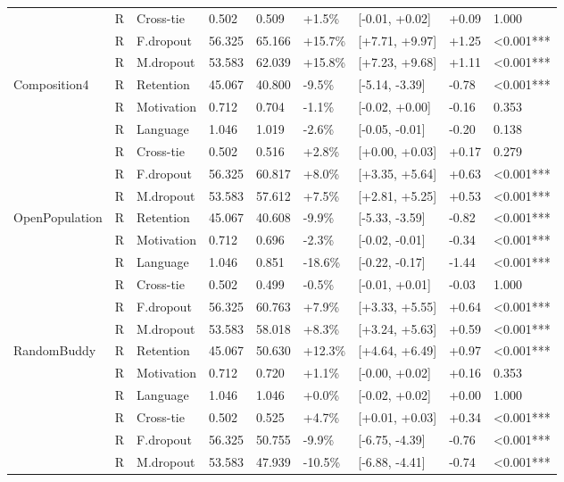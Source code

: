 \begin{longtable}[t]{lllllllll}
  & R & Cross-tie & 0.502 & 0.509 & +1.5\% & [-0.01, +0.02] & +0.09 & 1.000\\
  & R & F.dropout & 56.325 & 65.166 & +15.7\% & [+7.71, +9.97] & +1.25 & <0.001***\\
  & R & M.dropout & 53.583 & 62.039 & +15.8\% & [+7.23, +9.68] & +1.11 & <0.001***\\
\midrule
Composition4 & R & Retention & 45.067 & 40.800 & -9.5\% & [-5.14, -3.39] & -0.78 & <0.001***\\
  & R & Motivation & 0.712 & 0.704 & -1.1\% & [-0.02, +0.00] & -0.16 & 0.353\\
  & R & Language & 1.046 & 1.019 & -2.6\% & [-0.05, -0.01] & -0.20 & 0.138\\
  & R & Cross-tie & 0.502 & 0.516 & +2.8\% & [+0.00, +0.03] & +0.17 & 0.279\\
  & R & F.dropout & 56.325 & 60.817 & +8.0\% & [+3.35, +5.64] & +0.63 & <0.001***\\
  & R & M.dropout & 53.583 & 57.612 & +7.5\% & [+2.81, +5.25] & +0.53 & <0.001***\\
\midrule
OpenPopulation & R & Retention & 45.067 & 40.608 & -9.9\% & [-5.33, -3.59] & -0.82 & <0.001***\\
  & R & Motivation & 0.712 & 0.696 & -2.3\% & [-0.02, -0.01] & -0.34 & <0.001***\\
  & R & Language & 1.046 & 0.851 & -18.6\% & [-0.22, -0.17] & -1.44 & <0.001***\\
  & R & Cross-tie & 0.502 & 0.499 & -0.5\% & [-0.01, +0.01] & -0.03 & 1.000\\
  & R & F.dropout & 56.325 & 60.763 & +7.9\% & [+3.33, +5.55] & +0.64 & <0.001***\\
  & R & M.dropout & 53.583 & 58.018 & +8.3\% & [+3.24, +5.63] & +0.59 & <0.001***\\
\midrule
RandomBuddy & R & Retention & 45.067 & 50.630 & +12.3\% & [+4.64, +6.49] & +0.97 & <0.001***\\
  & R & Motivation & 0.712 & 0.720 & +1.1\% & [-0.00, +0.02] & +0.16 & 0.353\\
  & R & Language & 1.046 & 1.046 & +0.0\% & [-0.02, +0.02] & +0.00 & 1.000\\
  & R & Cross-tie & 0.502 & 0.525 & +4.7\% & [+0.01, +0.03] & +0.34 & <0.001***\\
  & R & F.dropout & 56.325 & 50.755 & -9.9\% & [-6.75, -4.39] & -0.76 & <0.001***\\
  & R & M.dropout & 53.583 & 47.939 & -10.5\% & [-6.88, -4.41] & -0.74 & <0.001***\\

\end{longtable}
